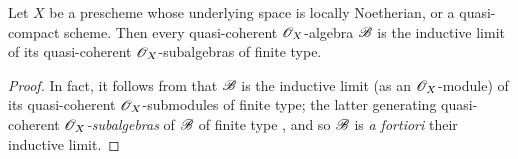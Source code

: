 \begin{prop}[9.6.6]
\label{1.9.6.6}
Let $X$ be a prescheme whose underlying space is locally Noetherian, or a quasi-compact scheme.
Then every quasi-coherent $\mathscr{O}_X$-algebra $\mathscr{B}$ is the inductive limit of its quasi-coherent $\mathscr{O}_X$-subalgebras of finite type.
\end{prop}

\begin{proof}
\label{proof-1.9.6.6}
In fact, it follows from  that $\mathscr{B}$ is the inductive limit (as an $\mathscr{O}_X$-module) of its quasi-coherent $\mathscr{O}_X$-submodules of finite type; the latter generating quasi-coherent \emph{$\mathscr{O}_X$-subalgebras} of $\mathscr{B}$ of finite type , and so $\mathscr{B}$ is \emph{a fortiori} their inductive limit.
\end{proof}
